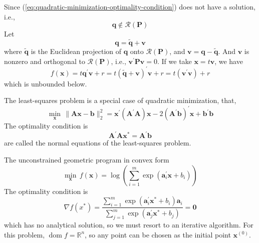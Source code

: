 \begin{example}
\begin{enumerate}
              Since (\ref{eq:quadratic-minimization-optimality-condition}) does not have a solution, i.e.,
              \begin{equation*}
                  \mathbf{q}\notin\mathcal{R}(\mathbf{P})
              \end{equation*}
              Let
              \begin{equation*}
                  \mathbf{q}=\tilde{\mathbf{q}}+\mathbf{v}
              \end{equation*}
              where $\tilde{\mathbf{q}}$ is the Euclidean projection of $\mathbf{q}$ onto $\mathcal{R}(\mathbf{P})$, and $\mathbf{v}=\mathbf{q}-\tilde{\mathbf{q}}$. And $\mathbf{v}$ is nonzero and orthogonal to $\mathcal{R}(\mathbf{P})$, i.e., $\mathbf{v}^{\prime}\mathbf{P}\mathbf{v}=0$. If we take $\mathbf{x}=t\mathbf{v}$, we have
              \begin{equation*}
                  f(\mathbf{x})=t\mathbf{q}^{\prime}\mathbf{v}+r=t(\tilde{\mathbf{q}}+\mathbf{v})^{\prime}\mathbf{v}+r=t(\mathbf{v}^{\prime}\mathbf{v})+r
              \end{equation*}
              which is unbounded below.
    \end{enumerate}
\end{example}

\begin{remark}
    The least-squares problem is a special case of quadratic minimization, that,
    \begin{equation}
        \min_{\mathbf{x}}\,\|\mathbf{A}\mathbf{x}-\mathbf{b}\|_{2}^{2}=\mathbf{x}^{\prime}\left(\mathbf{A}^{\prime}\mathbf{A}\right)\mathbf{x}-2\left(\mathbf{A}^{\prime}\mathbf{b}\right)^{\prime}\mathbf{x}+\mathbf{b}^{\prime}\mathbf{b}
    \end{equation}
    The optimality condition is
    \begin{equation}
        \mathbf{A}^{\prime}\mathbf{A}\mathbf{x}^{*}=\mathbf{A}^{\prime}\mathbf{b}
    \end{equation}
    are called the normal equations of the least-squares problem.
\end{remark}

\begin{example}
    The unconstrained geometric program in convex form
    \begin{equation}
        \min_{\mathbf{x}}\,f(\mathbf{x})=\log \left(\sum_{i=1}^{m}\exp\left(\mathbf{a}_{i}^{\prime}\mathbf{x}+b_{i}\right)\right)
    \end{equation}
    The optimality condition is
    \begin{equation}
        \nabla f\left(x^{*}\right)=\frac{\sum_{i=1}^{m}\exp\left(\mathbf{a}_{i}^{\prime}\mathbf{x}^{*}+b_{i}\right)\mathbf{a}_{i}}{\sum_{j=1}^{m}\exp\left(\mathbf{a}_{j}^{\prime}\mathbf{x}^{*}+b_{j}\right)}=\mathbf{0}
    \end{equation}
    which has no analytical solution, so we must resort to an iterative algorithm. For this problem, $\operatorname{dom} f=\mathbb{R}^{n}$, so any point can be chosen as the initial point $\mathbf{x}^{(0)}$.
\end{example}

